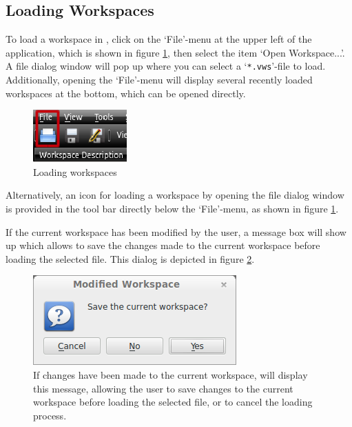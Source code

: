\subsection{Loading Workspaces}

To load a workspace in \Voreen, click on the `File'-menu at the upper left of the application, which is shown in figure \ref{fig:loading_workspaces}, 
then select the item `Open Workspace...'. A file dialog 
window will pop up where you can select a `\verb|*.vws|'-file to load. Additionally, opening the `File'-menu will display several recently loaded workspaces
at the bottom, which can be opened directly. 

\begin{figure}[htb]
 \centering
 \includegraphics[scale=1.0,keepaspectratio=true]{./images/loading_workspaces_2.png}
 \caption{Loading workspaces}
 \label{fig:loading_workspaces}
\end{figure}
Alternatively, an icon for loading a workspace by opening the file dialog window is provided in the tool bar directly below 
the `File'-menu, as shown in figure \ref{fig:loading_workspaces}. 

If the current workspace has been modified by the user, a message box will show up which allows to save the changes made to the current workspace
before loading the selected file. This dialog is depicted in figure \ref{fig:loading_workspaces_message}.

\begin{figure}[htb]
 \centering
 \includegraphics[scale=0.7,keepaspectratio=true]{./images/loading_workspaces_message.png}
 \caption{If changes have been made to the current workspace, \Voreen will display this message, allowing the user to save changes to the current workspace before loading the selected file, or to cancel the loading process.}
 \label{fig:loading_workspaces_message}
\end{figure}

